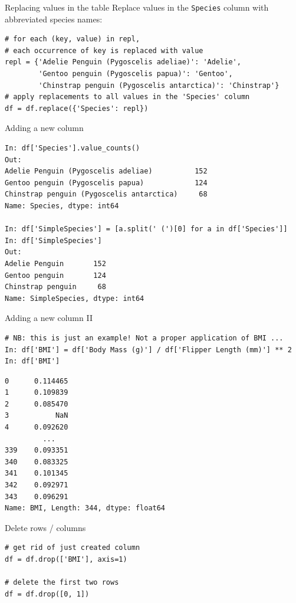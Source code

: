 \documentclass[aspectratio=169,usenames,dvipsnames]{beamer}
\begin{document}
\begin{frame}[fragile]{Replacing values in the table}
Replace values in the \texttt{Species} column with abbreviated species names:
\begin{lstlisting}
# for each (key, value) in repl,
# each occurrence of key is replaced with value
repl = {'Adelie Penguin (Pygoscelis adeliae)': 'Adelie',
        'Gentoo penguin (Pygoscelis papua)': 'Gentoo',
        'Chinstrap penguin (Pygoscelis antarctica)': 'Chinstrap'}
# apply replacements to all values in the 'Species' column
df = df.replace({'Species': repl})
\end{lstlisting}
\end{frame}

\begin{frame}[fragile]{Adding a new column}
\begin{lstlisting}
In: df['Species'].value_counts()
Out:
Adelie Penguin (Pygoscelis adeliae)          152
Gentoo penguin (Pygoscelis papua)            124
Chinstrap penguin (Pygoscelis antarctica)     68
Name: Species, dtype: int64

In: df['SimpleSpecies'] = [a.split(' (')[0] for a in df['Species']]
In: df['SimpleSpecies']
Out:
Adelie Penguin       152
Gentoo penguin       124
Chinstrap penguin     68
Name: SimpleSpecies, dtype: int64
\end{lstlisting}
\end{frame}

\begin{frame}[fragile]{Adding a new column II}
\begin{lstlisting}
# NB: this is just an example! Not a proper application of BMI ...
In: df['BMI'] = df['Body Mass (g)'] / df['Flipper Length (mm)'] ** 2
In: df['BMI']
\end{lstlisting}\vspace{-1em}\begin{lstlisting}[style=plain]
0      0.114465
1      0.109839
2      0.085470
3           NaN
4      0.092620
         ...   
339    0.093351
340    0.083325
341    0.101345
342    0.092971
343    0.096291
Name: BMI, Length: 344, dtype: float64
\end{lstlisting}
\end{frame}


\begin{frame}[fragile]{Delete rows / columns}
\begin{lstlisting}
# get rid of just created column
df = df.drop(['BMI'], axis=1)

# delete the first two rows
df = df.drop([0, 1])
\end{lstlisting}
\end{frame}
\end{document}
